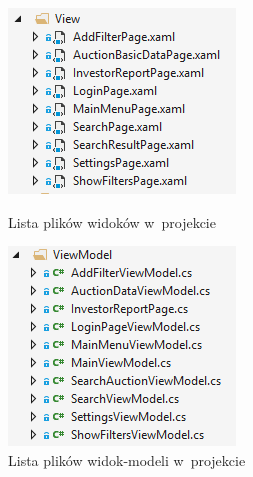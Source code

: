 \documentclass[a4paper,twoside,titlepage,openright]{book}
\begin{document}
\begin{figure}[h]
	\centering
	\begin{minipage}[h]{0.33\textwidth}
		\includegraphics[width=\textwidth]{listawidokow.png}
		\caption{Lista plików widoków w~projekcie}
	\end{minipage}
\hspace*{60px}
	\begin{minipage}[h]{0.33\textwidth}
		\includegraphics[width=\textwidth]{listaviewmodeli.png}
		\caption{Lista plików widok-modeli w~projekcie}
	\end{minipage}
	\hfill
\end{figure}
\end{document}
